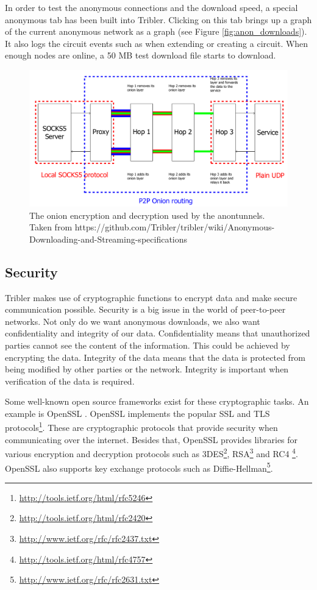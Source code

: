 			In order to test the anonymous connections and the download speed, a special anonymous tab has been built into Tribler. Clicking on this tab brings up a graph of the current anonymous network as a graph (see Figure \ref{fig:anon_downloads}). It also logs the circuit events such as when extending or creating a circuit. When enough nodes are online, a 50 MB test download file starts to download.
			
			\begin{figure}[!htb]
				\centering
				\includegraphics[width=\textwidth]{graphics/onion_encryption_decryption_socks5.png}
				\caption{The onion encryption and decryption used by the anontunnels. Taken from https://github.com/Tribler/tribler/wiki/Anonymous-Downloading-and-Streaming-specifications}
				\label{fig:onion_encryption_decryption_socks5}
			\end{figure}

	\subsection{Security}
	\label{sec:security}
		Tribler makes use of cryptographic functions to encrypt data and make secure communication possible. Security is a big issue in the world of peer-to-peer networks. Not only do we want anonymous downloads, we also want confidentiality and integrity of our data. Confidentiality means that unauthorized parties cannot see the content of the information. This could be achieved by encrypting the data. Integrity of the data means that the data is protected from being modified by other parties or the network. Integrity is important when verification of the data is required.
		
		Some well-known open source frameworks exist for these cryptographic tasks. An example is OpenSSL \cite{openssl}. OpenSSL implements the popular SSL and TLS protocols\footnote{\url{http://tools.ietf.org/html/rfc5246}}. These are cryptographic protocols that provide security when communicating over the internet. Besides that, OpenSSL provides libraries for various encryption and decryption protocols such as 3DES\footnote{\url{http://tools.ietf.org/html/rfc2420}}, RSA\footnote{\url{http://www.ietf.org/rfc/rfc2437.txt}} and RC4 \footnote{\url{http://tools.ietf.org/html/rfc4757}}. OpenSSL also supports key exchange protocols such as Diffie-Hellman\footnote{\url{http://www.ietf.org/rfc/rfc2631.txt}}.
		
